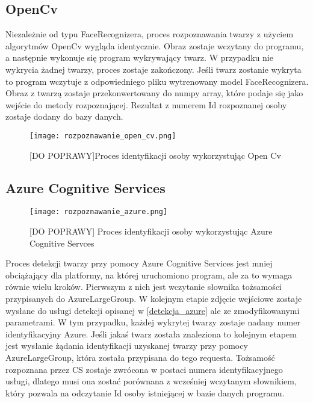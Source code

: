 \subsection{OpenCv}
Niezależnie od typu FaceRecognizera, proces rozpoznawania twarzy z użyciem algorytmów OpenCv wygląda identycznie. Obraz zostaje wczytany do programu, a następnie wykonuje się program wykrywający twarz. W przypadku nie wykrycia żadnej twarzy, proces zostaje zakończony. Jeśli twarz zostanie wykryta to program wczytuje z odpowiedniego pliku wytrenowany model FaceRecognizera. Obraz z twarzą zostaje przekonwertowany do numpy array, które podaje się jako wejście do metody rozpoznającej. Rezultat z numerem Id rozpoznanej osoby zostaje dodany do bazy danych.
\begin{figure}[H]
	\centering
	\texttt{[image: rozpoznawanie\_open\_cv.png]}
	\caption{[DO POPRAWY]Proces identyfikacji osoby wykorzystując Open Cv}
	\label{fig:rozpoznawanie_open_cv}
\end{figure}

\subsection{Azure Cognitive Services}
\begin{figure}[H]
	\centering
	\texttt{[image: rozpoznawanie\_azure.png]}
	\caption{[DO POPRAWY] Proces identyfikacji osoby wykorzystując Azure Cognitive Servces}
	\label{fig:rozpoznawanie_azure}
\end{figure}
Proces detekcji twarzy przy pomocy Azure Cognitive Services jest mniej obciążający dla platformy, na której uruchomiono program, ale za to wymaga równie wielu kroków. Pierwszym z nich jest wczytanie słownika tożsamości przypisanych do AzureLargeGroup. W kolejnym etapie zdjęcie wejściowe zostaje wysłane do usługi detekcji opisanej w \ref{detekcja_azure} ale ze zmodyfikowanymi parametrami. W tym przypadku, każdej wykrytej twarzy zostaje nadany numer identyfikacyjny Azure. Jeśli jakaś twarz została znaleziona to kolejnym etapem jest wysłanie żądania identyfikacji uzyskanej twarzy przy pomocy AzureLargeGroup, która została przypisana do tego requesta. Tożsamość rozpoznana przez CS zostaje zwrócona w postaci numera identyfikacyjnego usługi, dlatego musi ona zostać porównana z wcześniej wczytanym słownikiem, który pozwala na odczytanie Id osoby istniejącej w bazie danych programu.
